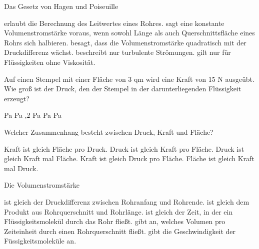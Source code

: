 \documentclass[11pt]{exam}
\begin{document}
\setlength{\voffset}{-0.5in}
\setlength{\headsep}{5pt}

\hspace{2mm}
 \hspace{5mm}
\vspace{4mm}

\begin{questions}

\question Das Gesetz von Hagen und Poiseuille

\begin{choices}
	\choice erlaubt die Berechnung des Leitwertes eines Rohres.
	\choice sagt eine konstante Volumenstromstärke voraus, wenn sowohl Länge als auch Querschnittsfläche eines Rohrs sich halbieren.
	\choice besagt, dass die Volumenstromstärke quadratisch mit der Druckdifferenz wächst.
	\choice beschreibt nur turbulente Strömungen.
	\choice gilt nur für Flüssigkeiten ohne Viskosität.
\end{choices}

\vspace{3mm}\question Auf einen Stempel mit einer Fläche von 3 qm wird eine Kraft von 15 N ausgeübt. Wie groß ist der Druck, den der Stempel in der darunterliegenden Flüssigkeit erzeugt?

\begin{choices}
	 Pa
	 Pa
	,2 Pa
	 Pa
	 Pa
\end{choices}

\vspace{3mm}\question Welcher Zusammenhang besteht zwischen Druck, Kraft und Fläche?

\begin{choices}
	\choice Kraft ist gleich Fläche pro Druck.
	\choice Druck ist gleich Kraft pro Fläche.
	\choice Druck ist gleich Kraft mal Fläche.
	\choice Kraft ist gleich Druck pro Fläche.
	\choice Fläche ist gleich Kraft mal Druck.
\end{choices}

\vspace{3mm}\question Die Volumenstromstärke

\begin{choices}
	\choice ist gleich der Druckdifferenz zwischen Rohranfang und Rohrende.
	\choice ist gleich dem Produkt aus Rohrquerschnitt und Rohrlänge.
	\choice ist gleich der Zeit, in der ein Flüssigkeitsmolekül durch das Rohr fließt.
	\choice gibt an, welches Volumen pro Zeiteinheit durch einen Rohrquerschnitt fließt.
	\choice gibt die Geschwindigkeit der Füssigkeitsmoleküle an.
\end{choices}


\end{questions}
\end{document}

